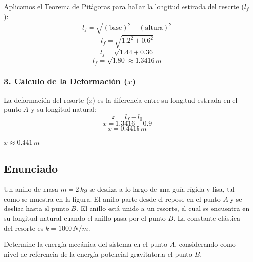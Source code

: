 \documentclass[12pt, a4paper]{article}
\begin{document}
Aplicamos el Teorema de Pitágoras para hallar la longitud estirada del resorte ($l_f$):
$$ l_f = \sqrt{(\text{base})^2 + (\text{altura})^2} $$
$$ l_f = \sqrt{1.2^2 + 0.6^2} $$
$$ l_f = \sqrt{1.44 + 0.36} $$
$$ l_f = \sqrt{1.80} \approx 1.3416 \, \si{m} $$

\subsubsection*{3. Cálculo de la Deformación ($x$)}
La deformación del resorte ($x$) es la diferencia entre su longitud estirada en el punto $A$ y su longitud natural:
$$ x = l_f - l_0 $$
$$ x = 1.3416 - 0.9 $$
$$ x = 0.4416 \, \si{m} $$

\begin{tcolorbox}[colback=green!5!white, colframe=green!50!black, title=Respuesta Final]
\centering \Large $x \approx 0.441 \, \si{m}$
\end{tcolorbox}

\newpage

\subsection*{Enunciado}
Un anillo de masa $m = 2 \, \si{kg}$ se desliza a lo largo de una guía rígida y lisa, tal como se muestra en la figura. El anillo parte desde el reposo en el punto $A$ y se desliza hasta el punto $B$. El anillo está unido a un resorte, el cual se encuentra en su longitud natural cuando el anillo pasa por el punto $B$. La constante elástica del resorte es $k = 1000 \, \si{N/m}$. 

Determine la energía mecánica del sistema en el punto $A$, considerando como nivel de referencia de la energía potencial gravitatoria el punto $B$.
\end{document}
